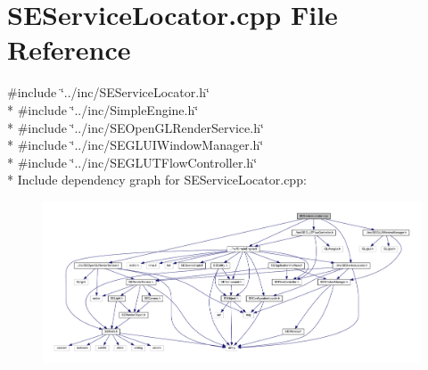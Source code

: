 \section{S\+E\+Service\+Locator.\+cpp File Reference}
\label{_s_e_service_locator_8cpp}
{\ttfamily \#include \char`\"{}../inc/\+S\+E\+Service\+Locator.\+h\char`\"{}}\\*
{\ttfamily \#include \char`\"{}../inc/\+Simple\+Engine.\+h\char`\"{}}\\*
{\ttfamily \#include \char`\"{}../inc/\+S\+E\+Open\+G\+L\+Render\+Service.\+h\char`\"{}}\\*
{\ttfamily \#include \char`\"{}../inc/\+S\+E\+G\+L\+U\+I\+Window\+Manager.\+h\char`\"{}}\\*
{\ttfamily \#include \char`\"{}../inc/\+S\+E\+G\+L\+U\+T\+Flow\+Controller.\+h\char`\"{}}\\*
Include dependency graph for S\+E\+Service\+Locator.\+cpp\+:
\nopagebreak
\begin{figure}[H]
\begin{center}
\leavevmode
\includegraphics[width=350pt]{_s_e_service_locator_8cpp__incl}
\end{center}
\end{figure}
